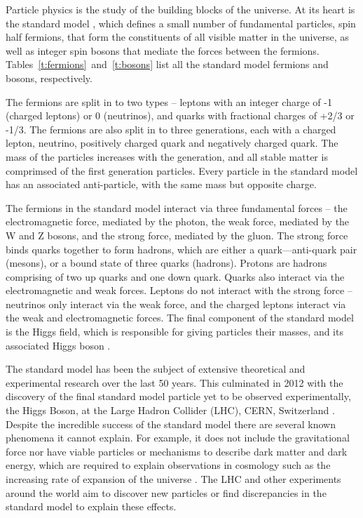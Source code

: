 

Particle physics is the study of the building blocks of the universe. At its heart is the standard model \cite{standMod}, which defines a small number of fundamental particles, spin half fermions, that form the constituents of all visible matter in the universe, as well as integer spin bosons that mediate the forces between the fermions. Tables~\ref{t:fermions}~and~\ref{t:bosons} list all the standard model fermions and bosons, respectively. 

The fermions are split in to two types -- leptons with an integer charge of -1 (charged leptons) or 0 (neutrinos), and quarks with fractional charges of +2/3 or -1/3. The fermions are also split in to three generations, each with a charged lepton, neutrino, positively charged quark and negatively charged quark. The mass of the particles increases with the generation, and all stable matter is comprimsed of the first generation particles. Every particle in the standard model has an associated anti-particle, with the same mass but opposite charge. 

The fermions in the standard model interact via three fundamental forces -- the electromagnetic force, mediated by the photon, the weak force, mediated by the W and Z bosons, and the strong force, mediated by the gluon. The strong force binds quarks together to form hadrons, which are either a quark---anti-quark pair (mesons), or a bound state of three quarks (hadrons). Protons are hadrons comprising of two up quarks and one down quark. Quarks also interact via the electromagnetic and weak forces. Leptons do not interact with the strong force -- neutrinos only interact via the weak force, and the charged leptons interact via the weak and electromagnetic forces. The final component of the standard model is the Higgs field,  which is responsible for giving particles their masses, and its associated Higgs boson \cite{higgsPap}.

The standard model has been the subject of extensive theoretical and experimental research over the last 50 years. This culminated in 2012 with the discovery of the final standard model particle yet to be observed experimentally, the Higgs Boson, at the Large Hadron Collider (LHC), CERN, Switzerland \cite{higgsATLAS,higgsCMS}. Despite the incredible success of the standard model there are several known phenomena it cannot explain. For example, it does not include the gravitational force nor have viable particles or mechanisms to describe dark matter and dark energy, which are required to explain observations in cosmology such as the increasing rate of expansion of the universe \cite{darkEn}. The LHC and other experiments around the world aim to discover new particles or find discrepancies in the standard model to explain these effects.


